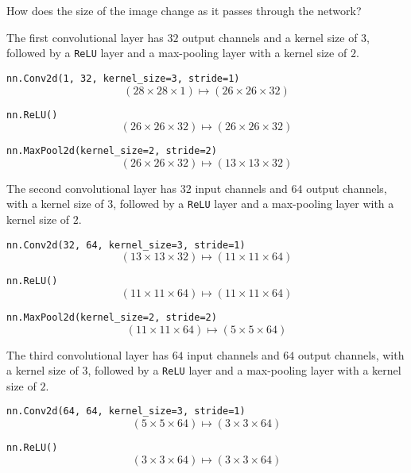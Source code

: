 \newpage
\begin{problem}
  How does the size of the image change as it passes through the network?
  \begin{answer}
    \begin{enumarabic}
      \item The first convolutional layer has $32$ output channels and a kernel size of $3$,
        followed by a \verb|ReLU| layer and a max-pooling layer with a kernel size of $2$.
        \begin{enumroman}
          \item \verb|nn.Conv2d(1, 32, kernel_size=3, stride=1)|
            \[ (28 \times 28 \times 1) \mapsto (26 \times 26 \times 32) \]
          \item \verb|nn.ReLU()|
            \[ (26 \times 26 \times 32) \mapsto (26 \times 26 \times 32) \]
          \item \verb|nn.MaxPool2d(kernel_size=2, stride=2)|
            \[ (26 \times 26 \times 32) \mapsto (13 \times 13 \times 32) \]
        \end{enumroman}
      \item The second convolutional layer has $32$ input channels and $64$ output channels,
        with a kernel size of $3$, followed by a \verb|ReLU| layer and a max-pooling layer with a kernel size of $2$.
        \begin{enumroman}
          \item \verb|nn.Conv2d(32, 64, kernel_size=3, stride=1)|
            \[ (13 \times 13 \times 32) \mapsto (11 \times 11 \times 64) \]
          \item \verb|nn.ReLU()|
            \[ (11 \times 11 \times 64) \mapsto (11 \times 11 \times 64) \]
          \item \verb|nn.MaxPool2d(kernel_size=2, stride=2)|
            \[ (11 \times 11 \times 64) \mapsto (5 \times 5 \times 64) \]
        \end{enumroman}
      \item The third convolutional layer has $64$ input channels and $64$ output channels,
        with a kernel size of $3$, followed by a \verb|ReLU| layer and a max-pooling layer with a kernel size of $2$.
        \begin{enumroman}
          \item \verb|nn.Conv2d(64, 64, kernel_size=3, stride=1)|
            \[ (5 \times 5 \times 64) \mapsto (3 \times 3 \times 64) \]
          \item \verb|nn.ReLU()|
            \[ (3 \times 3 \times 64) \mapsto (3 \times 3 \times 64) \]

\end{enumroman}
\end{enumarabic}
\end{answer}
\end{problem}
